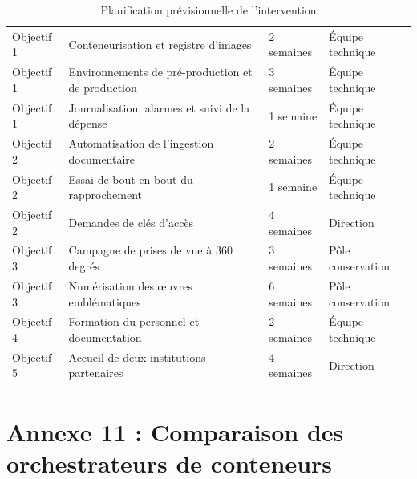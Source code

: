 \begin{table}[htbp]
\centering
\caption{Planification prévisionnelle de l'intervention}
\label{tab:planning}
\small
\begin{tabularx}{\textwidth}{|C{1.9cm}|X|C{2.2cm}|C{2.6cm}|}
\hline
{}
 &  &  &  \\ \hline
Objectif 1 & Conteneurisation et registre d'images & 2 semaines & Équipe technique \\ \hline
Objectif 1 & Environnements de pré-production et de production & 3 semaines & Équipe technique \\ \hline
Objectif 1 & Journalisation, alarmes et suivi de la dépense & 1 semaine & Équipe technique \\ \hline
Objectif 2 & Automatisation de l'ingestion documentaire & 2 semaines & Équipe technique \\ \hline
Objectif 2 & Essai de bout en bout du rapprochement & 1 semaine & Équipe technique \\ \hline
Objectif 2 & Demandes de clés d'accès & 4 semaines & Direction \\ \hline
Objectif 3 & Campagne de prises de vue à 360 degrés & 3 semaines & Pôle conservation \\ \hline
Objectif 3 & Numérisation des œuvres emblématiques & 6 semaines & Pôle conservation \\ \hline
Objectif 4 & Formation du personnel et documentation & 2 semaines & Équipe technique \\ \hline
Objectif 5 & Accueil de deux institutions partenaires & 4 semaines & Direction \\ \hline
\end{tabularx}
\end{table}


\cleardoublepage
\chapter*{Annexe 11 : Comparaison des orchestrateurs de conteneurs}

\vspace{0.3cm}

